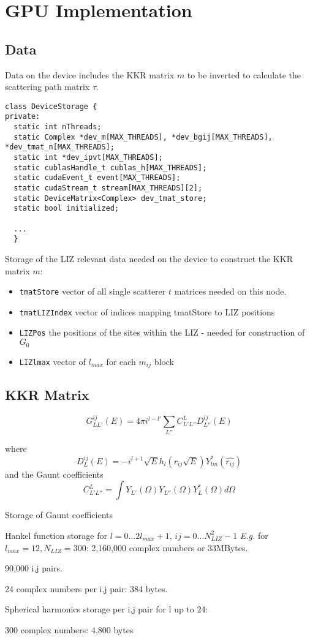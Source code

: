 \chapter{GPU Implementation}

\section{Data}

Data on the device includes the KKR matrix $m$ to be inverted to calculate the scattering path matrix $\tau$.

\begin{verbatim}
class DeviceStorage {
private:
  static int nThreads;
  static Complex *dev_m[MAX_THREADS], *dev_bgij[MAX_THREADS], *dev_tmat_n[MAX_THREADS];
  static int *dev_ipvt[MAX_THREADS];
  static cublasHandle_t cublas_h[MAX_THREADS];
  static cudaEvent_t event[MAX_THREADS];
  static cudaStream_t stream[MAX_THREADS][2];
  static DeviceMatrix<Complex> dev_tmat_store;
  static bool initialized;
  
  ...
  }
\end{verbatim}

Storage of the LIZ relevant data needed on the device to construct the KKR matrix $m$:
\begin{itemize}
\item \texttt{tmatStore} vector of all single scatterer $t$ matrices needed on this node. 
\item \texttt{tmatLIZIndex} vector of indices mapping tmatStore to LIZ positions
\item \texttt{LIZPos} the positions of the sites within the LIZ - needed for construction of $G_0$
\item \texttt{LIZlmax} vector of $l_{max}$ for each $m_{ij}$ block
\end{itemize}

\section{KKR Matrix}

\begin{equation}
G^{ij}_{LL'}(E) = 4\pi i^{l-l'} \sum_{L''} C^L_{L' L''} D^{ij}_{L''}(E)
\end{equation}

where
\begin{equation}
D^{ij}_{L}(E) = -i^{l+1} \sqrt{E} h_l(r_{ij} \sqrt{E}) Y_{lm}^*(\hat{r_{ij}})
\end{equation}
and the Gaunt coefficients
\begin{equation}
C^L_{L' L''} = \int Y_{L'}(\Omega) Y_{L''}(\Omega) Y^*_L(\Omega) d\Omega
\end{equation}

Storage of Gaunt coefficients

Hankel function storage for $l=0\ldots 2 l_{max} +1$, $ij=0\ldots N_{LIZ}^2-1$
\textit{E.g.} for $l_{max}=12, N_{LIZ}=300$: 2,160,000 complex numbers or 33MBytes.

90,000 i,j pairs.

24 complex numbers per i,j pair: 384 bytes.

Spherical harmonics storage per i,j pair for l up to 24:

300 complex numbers: 4,800 bytes